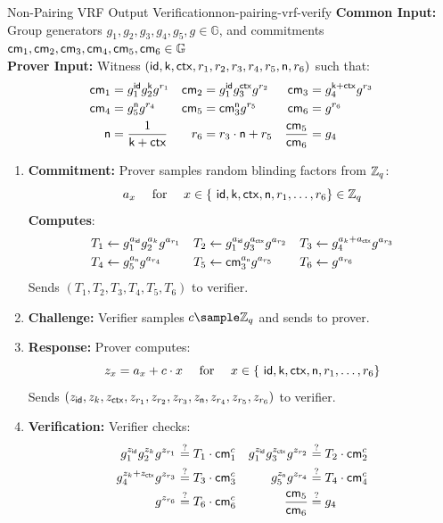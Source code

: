 \begin{protocol}{Non-Pairing VRF Output Verification}{non-pairing-vrf-verify}\label{pok-non-pairing-vrf}
\textbf{Common Input:} Group generators $g_1, g_2, g_3, g_4, g_5, g \in \mathbb{G}$, and commitments $\mathsf{cm}_1, \mathsf{cm}_2, \mathsf{cm}_3, \mathsf{cm}_4, \mathsf{cm}_5, \mathsf{cm}_6 \in \mathbb{G}$\\
\textbf{Prover Input:} Witness $(\mathsf{id}, \mathsf{k}, \mathsf{ctx}, r_1, r_2, r_3, r_4, r_5, \textsf{n}, r_6)$ such that:
    \begin{align*}
        \mathsf{cm}_1 &= g_1^{\mathsf{id}} g_2^{\mathsf{k}} g^{r_1}     &    \mathsf{cm}_2 &= g_1^{\mathsf{id}} g_3^{\mathsf{ctx}} g^{r_2}  &   \mathsf{cm}_3 &= g_4^{\mathsf{k} + \mathsf{ctx}} g^{r_3}\\
        \mathsf{cm}_4 &= g_5^{\textsf{n}} g^{r_4}   &   \mathsf{cm}_5 &= \mathsf{cm}_3^{\textsf{n}} g^{r_5}     &   \mathsf{cm}_6 &= g^{r_6} \\
        \textsf{n} &= \frac{1}{\mathsf{k} + \mathsf{ctx}}   &   r_6 &= r_3 \cdot \textsf{n} + r_5    &   \frac{\mathsf{cm}_5}{\mathsf{cm}_6} &= g_4
    \end{align*}

\begin{enumerate}
    \item \textbf{Commitment:} Prover samples random blinding factors from $\mathbb{Z}_q$:
    \[
        a_x \quad \text{ for } \quad x \in \{\ \mathsf{id}, \mathsf{k}, \mathsf{ctx}, \textsf{n}, r_1, \ldots,r_6\} \in \mathbb{Z}_q
    \]
    \textbf{Computes}:
    \begin{align*}
        T_1 &\gets g_1^{a_{\mathsf{id}}} g_2^{a_k} g^{a_{r_1}}  &   T_2 &\gets g_1^{a_{\mathsf{id}}} g_3^{a_{\mathsf{ctx}}} g^{a_{r_2}}     &   T_3 &\gets g_4^{a_k + a_{\mathsf{ctx}}} g^{a_{r_3}} \\
        T_4 &\gets g_5^{a_{\textsf{n}}} g^{a_{r_4}}   &   T_5 &\gets \mathsf{cm}_3^{a_{\textsf{n}}} g^{a_{r_5}}     &   T_6 &\gets g^{a_{r_6}}
    \end{align*}
    Sends $(T_1, T_2, T_3, T_4, T_5, T_6)$ to verifier.
    
    \item \textbf{Challenge:} Verifier samples $c \sample \mathbb{Z}_q$ and sends to prover.
    
    \item \textbf{Response:} Prover computes:
    \[
    z_x = a_x + c \cdot x \quad \text{ for } \quad x \in \{\ \mathsf{id}, \mathsf{k}, \mathsf{ctx}, \textsf{n}, r_1, \ldots,r_6\} 
    \]
    Sends $(z_{\mathsf{id}}, z_k, z_{\mathsf{ctx}}, z_{r_1}, z_{r_2}, z_{r_3}, z_{\textsf{n}}, z_{r_4}, z_{r_5}, z_{r_6})$ to verifier.
    
    \item \textbf{Verification:} Verifier checks:
    \begin{align*}
        g_1^{z_{\mathsf{id}}} g_2^{z_k} g^{z_{r_1}} &\stackrel{?}{=} T_1 \cdot \mathsf{cm}_1^c 
        & 
        g_1^{z_{\mathsf{id}}} g_3^{z_{\mathsf{ctx}}} g^{z_{r_2}} &\stackrel{?}{=} T_2 \cdot \mathsf{cm}_2^c \\
        g_4^{z_k + z_{\mathsf{ctx}}} g^{z_{r_3}} &\stackrel{?}{=} T_3 \cdot \mathsf{cm}_3^c
        &
        g_5^{z_{\textsf{n}}} g^{z_{r_4}} &\stackrel{?}{=} T_4 \cdot \mathsf{cm}_4^c \\
        g^{z_{r_6}} &\stackrel{?}{=} T_6 \cdot \mathsf{cm}_6^c
        &
        \frac{\mathsf{cm}_5}{\mathsf{cm}_6} &\stackrel{?}{=} g_4
    \end{align*}
\end{enumerate}
\end{protocol}


